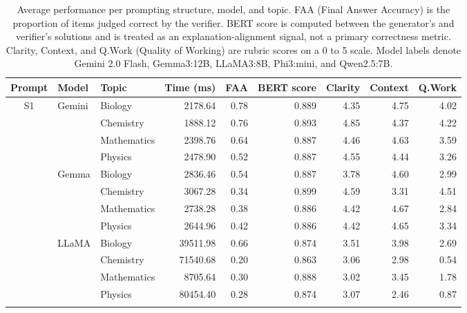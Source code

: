 ﻿\documentclass[a4paper,conference,10pt]{IEEEtran}
\begin{document}
\begin{table}[!t]
\centering
\small
\caption{Average performance per prompting structure, model, and topic. FAA (Final Answer Accuracy) is the proportion of items judged correct by the verifier. BERT score is computed between the generator's and verifier's solutions and is treated as an explanation-alignment signal, not a primary correctness metric. Clarity, Context, and Q.Work (Quality of Working) are rubric scores on a 0 to 5 scale. Model labels denote Gemini 2.0 Flash, Gemma3:12B, LLaMA3:8B, Phi3:mini, and Qwen2.5:7B.}
\label{tab:main-results}
\begin{tabular}{|c|l|l|r|r|r|r|r|r|}
\hline
Prompt & Model & Topic & Time (ms) & FAA & BERT score & Clarity & Context & Q.Work \\
\hline
\multirow{20}{*}{S1}
  & \multirow{4}{*}{Gemini} & Biology     & 2178.64 & 0.78 & 0.889 & 4.35 & 4.75 & 4.02 \\
  &                         & Chemistry   & 1888.12 & 0.76 & 0.893 & 4.85 & 4.37 & 4.22 \\
  &                         & Mathematics & 2398.76 & 0.64          & 0.887 & 4.46 & 4.63 & 3.59 \\
  &                         & Physics     & 2478.90 & 0.52          & 0.887 & 4.55 & 4.44 & 3.26 \\ \cline{2-9}
  & \multirow{4}{*}{Gemma}  & Biology     & 2836.46 & 0.54          & 0.887 & 3.78          & 4.60 & 2.99 \\
  &                         & Chemistry   & 3067.28 & 0.34          & 0.899 & 4.59 & 3.31 & 4.51 \\
  &                         & Mathematics & 2738.28 & 0.38          & 0.886 & 4.42 & 4.67 & 2.84 \\
  &                         & Physics     & 2644.96 & 0.42          & 0.886 & 4.42 & 4.65 & 3.34 \\ \cline{2-9}
  & \multirow{4}{*}{LLaMA}  & Biology     & 39511.98         & 0.66          & 0.874 & 3.51          & 3.98 & 2.69 \\
  &                         & Chemistry   & 71540.68         & 0.20          & 0.863 & 3.06          & 2.98 & 0.54 \\
  &                         & Mathematics &  8705.64         & 0.30          & 0.888 & 3.02          & 3.45 & 1.78 \\
  &                         & Physics     & 80454.40         & 0.28          & 0.874 & 3.07          & 2.46 & 0.87 \\ \cline{2-9}

\end{tabular}
\end{table}
\end{document}
